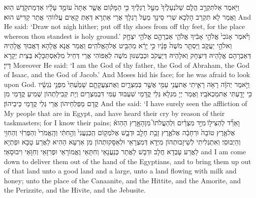 {וַיֹּ֖אמֶר אַל\maqqaf תִּקְרַ֣ב הֲלֹ֑ם שַׁל\maqqaf נְעָלֶ֙יךָ֙ מֵעַ֣ל רַגְלֶ֔יךָ כִּ֣י הַמָּק֗וֹם אֲשֶׁ֤ר אַתָּה֙ עוֹמֵ֣ד עָלָ֔יו אַדְמַת\maqqaf קֹ֖דֶשׁ הֽוּא׃}
{וַאֲמַר לָא תִּקְרַב הָלְכָא שְׁרִי סֵינָךְ מֵעַל רַגְלָךְ אֲרֵי אַתְרָא דְּאַתְּ קָאֵים עֲלווֹהִי אֲתַר קַדִּישׁ הוּא׃}
{And He said: ‘Draw not nigh hither; put off thy shoes from off thy feet, for the place whereon thou standest is holy ground.’}{}
{וַיֹּ֗אמֶר אָנֹכִי֙ אֱלֹהֵ֣י אָבִ֔יךָ אֱלֹהֵ֧י אַבְרָהָ֛ם אֱלֹהֵ֥י יִצְחָ֖ק וֵאלֹהֵ֣י יַעֲקֹ֑ב וַיַּסְתֵּ֤ר מֹשֶׁה֙ פָּנָ֔יו כִּ֣י יָרֵ֔א מֵהַבִּ֖יט אֶל\maqqaf הָאֱלֹהִֽים׃}
{וַאֲמַר אֲנָא אֱלָהָא דַּאֲבוּךְ אֱלָהֵיהּ דְּאַבְרָהָם אֱלָהֵיהּ דְּיִצְחָק וֵאלָהֵיהּ דְּיַעֲקֹב וּכְבַשִׁנּוּן מֹשֶׁה לְאַפּוֹהִי אֲרֵי דְּחֵיל מִלְּאִסְתַּכָּלָא בְּצֵית יְקָרָא דַּייָ׃}
{Moreover He said: ‘I am the God of thy father, the God of Abraham, the God of Isaac, and the God of Jacob.’ And Moses hid his face; for he was afraid to look upon God.}{}
{וַיֹּ֣אמֶר יְהֹוָ֔ה רָאֹ֥ה רָאִ֛יתִי אֶת\maqqaf עֳנִ֥י עַמִּ֖י אֲשֶׁ֣ר בְּמִצְרָ֑יִם וְאֶת\maqqaf צַעֲקָתָ֤ם שָׁמַ֙עְתִּי֙ מִפְּנֵ֣י נֹֽגְשָׂ֔יו כִּ֥י יָדַ֖עְתִּי אֶת\maqqaf מַכְאֹבָֽיו׃}
{וַאֲמַר יְיָ מִגְלָא גְּלֵי קֳדָמַי שִׁעְבּוּד עַמִּי דִּבְמִצְרָיִם וְיָת קְבִילַתְהוֹן שְׁמִיעַ קֳדָמַי מִן קֳדָם מַפְלְחֵיהוֹן אֲרֵי גְּלֵי קֳדָמַי כֵּיבֵיהוֹן׃}
{And the \lord\space said: ‘I have surely seen the affliction of My people that are in Egypt, and have heard their cry by reason of their taskmasters; for I know their pains;}{}
{וָאֵרֵ֞ד לְהַצִּיל֣וֹ \legarmeh  מִיַּ֣ד מִצְרַ֗יִם וּֽלְהַעֲלֹתוֹ֮ מִן\maqqaf הָאָ֣רֶץ הַהִוא֒ אֶל\maqqaf אֶ֤רֶץ טוֹבָה֙ וּרְחָבָ֔ה אֶל\maqqaf אֶ֛רֶץ זָבַ֥ת חָלָ֖ב וּדְבָ֑שׁ אֶל\maqqaf מְק֤וֹם הַֽכְּנַעֲנִי֙ וְהַ֣חִתִּ֔י וְהָֽאֱמֹרִי֙ וְהַפְּרִזִּ֔י וְהַחִוִּ֖י וְהַיְבוּסִֽי׃}
{וְאִתְגְּלִיתִי לְשֵׁיזָבוּתְהוֹן מִיְּדָא דְּמִצְרָאֵי וּלְאַסָּקוּתְהוֹן מִן אַרְעָא הַהִיא לַאֲרַע טָבָא וּפַתְיָא לַאֲרַע עָבְדָא חֲלָב וּדְבָשׁ לַאֲתַר כְּנַעֲנָאֵי וְחִתָּאֵי וֶאֱמוֹרָאֵי וּפְרִזָּאֵי וְחִוָּאֵי וִיבוּסָאֵי׃}
{and I am come down to deliver them out of the hand of the Egyptians, and to bring them up out of that land unto a good land and a large, unto a land flowing with milk and honey; unto the place of the Canaanite, and the Hittite, and the Amorite, and the Perizzite, and the Hivite, and the Jebusite.}{}
